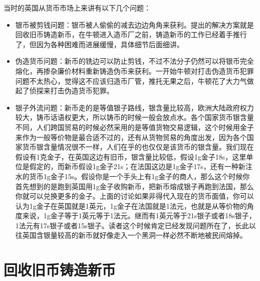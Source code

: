 \documentclass[12pt,oneside]{book}
\begin{document}
当时的英国从货币市场上来讲有以下几个问题：

\begin{itemize}
\item 银币被剪钱问题：银币被人偷偷的减去边边角角来获利。提出的解决方案就是回收旧币铸造新币，在牛顿进入造币厂之前，铸造新币的工作已经着手推行了，但因为各种困难而进展缓慢，具体细节后面细讲。

\item 伪造货币问题：新币的铣边可以防止剪钱，不过不法分子仍然可以将银币完全熔化，再掺杂廉价材料重新铸造伪币来获利。一开始牛顿对打击伪造货币犯罪问题不太热心，觉得这不应该归造币厂管，推托无果之后，牛顿花了大力气做起了侦探来打击伪造货币犯罪。

\item 银子外流问题：新币走的是等值银子路线，银含量比较高，欧洲大陆政府权力较大，铸币话语权更大，所以铸币的时候一般会放点水。各个国家货币银含量不同，人们跨国贸易的时候必然采用的是等值货物交易逻辑，这个时候用金子来作为一般等价物是最合适不过的，还有从货物贸易的角度出发，因为各个国家货币银含量情况很不一样，人们在乎的也仅仅是该货币的银含量。我们现在假设有1克金子，在英国这边有旧币，银含量比较低，假设1g金子18s，这里单位是假定的，而新币假设1g金子21s；在法国这边是1g金子17s，还有一种新注水的货币1g金子15s。假设你是一个手头上有1g金子的商人，那么这个时候你首先想到的是跑到英国用1g金子收购新币，把新币熔成银子再跑到法国，那么你就可以兑换更多的金子。上面的讨论如果非得代入现在的货币面值，你可以认为1g金子在英国就是1英元，1g金子在法国就是1法元，也就是从等价物的角度来说，1g金子等于1英元等于1法元。继而有1英元等于21s银子或者18s银子，1法元有17s银子或者15s银子。读者这个时候肯定已经发现问题所在了，长此以往英国含银量较高的新币就好像走入一个黑洞一样必然不断地被民间熔掉。
\end{itemize}





\section{回收旧币铸造新币}
\end{document}
